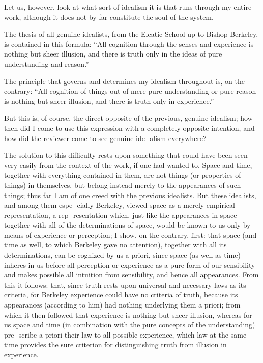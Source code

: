 Let us, however, look at what sort of idealism it is that runs through
my entire work, although it does not by far constitute the soul of the
system.

The thesis of all genuine idealists,
from the Eleatic School up to Bishop Berkeley,
is contained in this formula:
“All cognition through the senses and experience is
nothing but sheer illusion,
and there is truth only in the ideas of
pure understanding and reason.”

The principle that governs and determines
my idealism throughout is, on the contrary:
“All cognition of things
out of mere pure understanding or pure reason is
nothing but sheer illusion,
and there is truth only in experience.”

But this is, of course, the direct opposite of the previous, genuine
idealism; how then did I come to use this expression with a completely
opposite intention, and how did the reviewer come to see genuine ide-
alism everywhere?

The solution to this difﬁculty rests upon something that could have
been seen very easily from the context of the work, if one had wanted
to. Space and time, together with everything contained in them, are
not things (or properties of things) in themselves, but belong instead
merely to the appearances of such things; thus far I am of one creed
with the previous idealists. But these idealists, and among them espe-
cially Berkeley, viewed space as a merely empirical representation, a rep-
resentation which, just like the appearances in space together with all
of the determinations of space, would be known to us only by means
of experience or perception; I show, on the contrary, ﬁrst: that space
(and time as well, to which Berkeley gave no attention), together with
all its determinations, can be cognized by us a priori, since space (as
well as time) inheres in us before all perception or experience as a pure
form of our sensibility and makes possible all intuition from sensibility,
and hence all appearances. From this it follows: that, since truth rests
upon universal and necessary laws as its criteria, for Berkeley experience
could have no criteria of truth, because its appearances (according to
him) had nothing underlying them a priori; from which it then followed
that experience is nothing but sheer illusion, whereas for us space and
time (in combination with the pure concepts of the understanding) pre-
scribe a priori their law to all possible experience, which law at the same
time provides the sure criterion for distinguishing truth from illusion in
experience.

